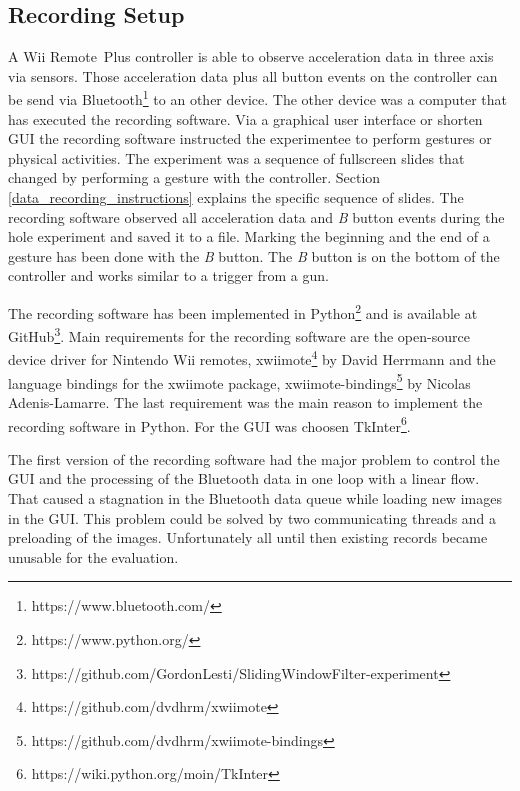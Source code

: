 \subsection{Recording Setup} \label{recording_setup}
A Wii Remote\texttrademark~Plus controller is able to observe acceleration data in three axis via sensors. Those
acceleration data plus all button events on the controller can be send via
Bluetooth\footnote{https://www.bluetooth.com/} to an other device. The other device was a computer that has executed the
recording software. Via a graphical user interface or shorten GUI the recording software instructed the experimentee to
perform gestures or physical activities. The experiment was a sequence of fullscreen slides that changed by performing a
gesture with the controller. Section \ref{data_recording_instructions} explains the specific sequence of slides. The
recording software observed all acceleration data and \textit{B} button events during the hole experiment and saved it
to a file. Marking the beginning and the end of a gesture has been done with the \textit{B} button. The \textit{B}
button is on the bottom of the controller and works similar to a trigger from a gun.

The recording software has been implemented in Python\footnote{https://www.python.org/} and is available at
GitHub\footnote{https://github.com/GordonLesti/SlidingWindowFilter-experiment}. Main requirements for the recording
software are the open-source device driver for Nintendo Wii remotes,
xwiimote\footnote{https://github.com/dvdhrm/xwiimote} by David Herrmann and the language bindings for the xwiimote
package, xwiimote-bindings\footnote{https://github.com/dvdhrm/xwiimote-bindings} by Nicolas Adenis-Lamarre. The last
requirement was the main reason to implement the recording software in Python. For the GUI was choosen
TkInter\footnote{https://wiki.python.org/moin/TkInter}.

The first version of the recording software had the major problem to control the GUI and the
processing of the Bluetooth data in one loop with a linear flow. That caused a stagnation in the Bluetooth data queue
while loading new images in the GUI. This problem could be solved by two communicating threads and a preloading of the
images. Unfortunately all until then existing records became unusable for the evaluation.


